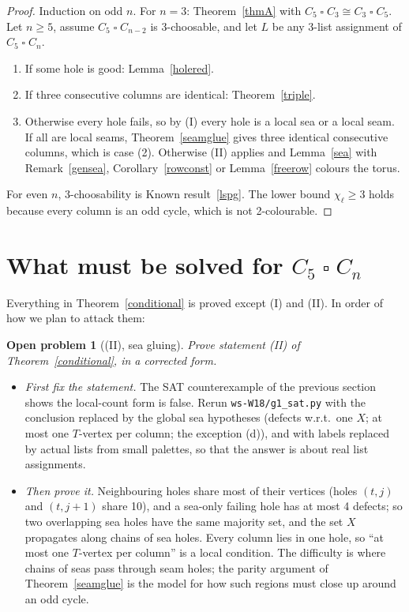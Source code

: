\documentclass[11pt]{article}
\theoremstyle{plain}
\newtheorem{openprob}[theorem]{Open problem}
\theoremstyle{definition}
\theoremstyle{remark}
\newcommand{\T}{\mathbin{\square}}
\newcommand{\script}[1]{\texttt{#1}}
\begin{document}
\begin{proof}
Induction on odd $n$. For $n = 3$: Theorem~\ref{thmA} with $C_5 \T C_3 \cong C_3 \T C_5$. Let $n \ge 5$, assume $C_5 \T C_{n-2}$ is
3-choosable, and let $L$ be any 3-list assignment of $C_5 \T C_n$.
\begin{enumerate}[label=(\arabic*),nosep]
\item If some hole is good: Lemma~\ref{holered}.
\item If three consecutive columns are identical: Theorem~\ref{triple}.
\item Otherwise every hole fails, so by (I) every hole is a local sea or a local seam. If all are local seams,
Theorem~\ref{seamglue} gives three identical consecutive columns, which is case (2). Otherwise (II) applies and
Lemma~\ref{sea} with Remark~\ref{gensea}, Corollary~\ref{rowconst} or Lemma~\ref{freerow} colours the torus.
\end{enumerate}
For even $n$, 3-choosability is Known result~\ref{lspg}. The lower bound $\chi_\ell \ge 3$ holds because every column is
an odd cycle, which is not 2-colourable.
\end{proof}

\section{What must be solved for $C_5 \T C_n$}\label{sec:todo}

Everything in Theorem~\ref{conditional} is proved except (I) and (II). In order of how we plan to attack them:

\begin{openprob}[(II), sea gluing]\label{op2}
Prove statement (II) of Theorem~\ref{conditional}, in a corrected form.
\end{openprob}
\begin{itemize}[itemsep=0.2em]
\item \emph{First fix the statement.} The SAT counterexample of the previous section shows the local-count form is false.
Rerun \script{ws-W18/g1\_sat.py} with the conclusion replaced by the global sea hypotheses (defects w.r.t.\ one $X$; at most
one $T$-vertex per column; the exception (d)), and with labels replaced by actual lists from small palettes, so that the
answer is about real list assignments.
\item \emph{Then prove it.} Neighbouring holes share most of their vertices (holes $(t, j)$ and $(t, j+1)$ share 10), and a
sea-only failing hole has at most 4 defects; so two overlapping sea holes have the same majority set, and the set $X$ propagates
along chains of sea holes. Every column lies in one hole, so ``at most one $T$-vertex per column'' is a local condition.
The difficulty is where chains of seas pass through seam holes; the parity argument of Theorem~\ref{seamglue} is the
model for how such regions must close up around an odd cycle.
\end{itemize}
\end{document}
